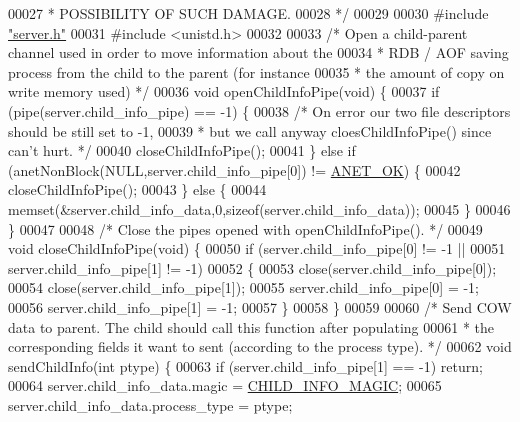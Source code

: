 \begin{DoxyCode}
00027 \textcolor{comment}{ * POSSIBILITY OF SUCH DAMAGE.}
00028 \textcolor{comment}{ */}
00029 
00030 \textcolor{preprocessor}{#}\textcolor{preprocessor}{include} \hyperlink{server_8h}{"server.h"}
00031 \textcolor{preprocessor}{#}\textcolor{preprocessor}{include} \textcolor{preprocessor}{<}\textcolor{preprocessor}{unistd}\textcolor{preprocessor}{.}\textcolor{preprocessor}{h}\textcolor{preprocessor}{>}
00032 
00033 \textcolor{comment}{/* Open a child-parent channel used in order to move information about the}
00034 \textcolor{comment}{ * RDB / AOF saving process from the child to the parent (for instance}
00035 \textcolor{comment}{ * the amount of copy on write memory used) */}
00036 \textcolor{keywordtype}{void} openChildInfoPipe(\textcolor{keywordtype}{void}) \{
00037     \textcolor{keywordflow}{if} (pipe(server.child\_info\_pipe) == -1) \{
00038         \textcolor{comment}{/* On error our two file descriptors should be still set to -1,}
00039 \textcolor{comment}{         * but we call anyway cloesChildInfoPipe() since can't hurt. */}
00040         closeChildInfoPipe();
00041     \} \textcolor{keywordflow}{else} \textcolor{keywordflow}{if} (anetNonBlock(NULL,server.child\_info\_pipe[0]) != \hyperlink{anet_8h_a25fb91ccc6457153f6d2e21380d4c6cf}{ANET\_OK}) \{
00042         closeChildInfoPipe();
00043     \} \textcolor{keywordflow}{else} \{
00044         memset(&server.child\_info\_data,0,\textcolor{keyword}{sizeof}(server.child\_info\_data));
00045     \}
00046 \}
00047 
00048 \textcolor{comment}{/* Close the pipes opened with openChildInfoPipe(). */}
00049 \textcolor{keywordtype}{void} closeChildInfoPipe(\textcolor{keywordtype}{void}) \{
00050     \textcolor{keywordflow}{if} (server.child\_info\_pipe[0] != -1 ||
00051         server.child\_info\_pipe[1] != -1)
00052     \{
00053         close(server.child\_info\_pipe[0]);
00054         close(server.child\_info\_pipe[1]);
00055         server.child\_info\_pipe[0] = -1;
00056         server.child\_info\_pipe[1] = -1;
00057     \}
00058 \}
00059 
00060 \textcolor{comment}{/* Send COW data to parent. The child should call this function after populating}
00061 \textcolor{comment}{ * the corresponding fields it want to sent (according to the process type). */}
00062 \textcolor{keywordtype}{void} sendChildInfo(\textcolor{keywordtype}{int} ptype) \{
00063     \textcolor{keywordflow}{if} (server.child\_info\_pipe[1] == -1) \textcolor{keywordflow}{return};
00064     server.child\_info\_data.magic = \hyperlink{server_8h_a5486686c8ced8ece3cdd7d936efd24ac}{CHILD\_INFO\_MAGIC};
00065     server.child\_info\_data.process\_type = ptype;

\end{DoxyCode}
